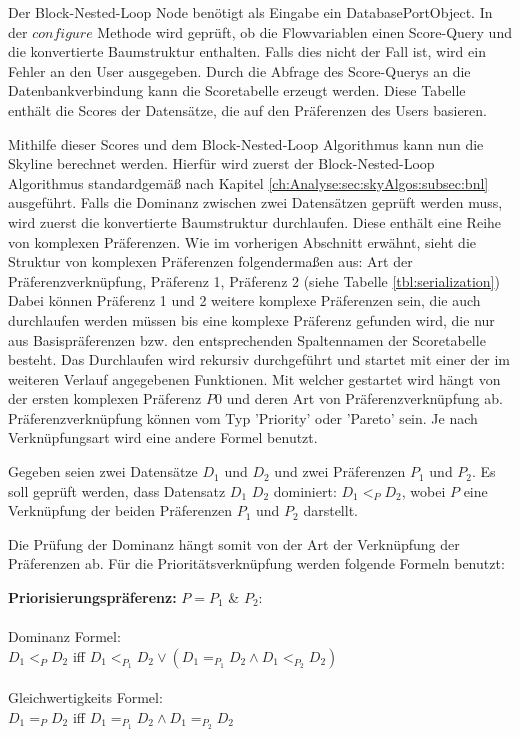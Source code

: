 Der Block-Nested-Loop Node benötigt als Eingabe ein DatabasePortObject. In der $configure$ Methode wird geprüft, ob die Flowvariablen einen Score-Query und die konvertierte Baumstruktur enthalten. Falls dies nicht der Fall ist, wird ein Fehler an den User ausgegeben.
Durch die Abfrage des Score-Querys an die Datenbankverbindung kann die Scoretabelle erzeugt werden. Diese Tabelle enthält die Scores der Datensätze, die auf den Präferenzen des Users basieren.

Mithilfe dieser Scores und dem Block-Nested-Loop Algorithmus kann nun die Skyline berechnet werden.
Hierfür wird zuerst der Block-Nested-Loop Algorithmus standardgemäß nach Kapitel \ref{ch:Analyse:sec:skyAlgos:subsec:bnl} ausgeführt. Falls die Dominanz zwischen zwei Datensätzen geprüft werden muss, wird zuerst die konvertierte Baumstruktur durchlaufen. Diese enthält eine Reihe von komplexen Präferenzen.
Wie im vorherigen Abschnitt erwähnt, sieht die Struktur von komplexen Präferenzen folgendermaßen aus: Art der Präferenzverknüpfung, Präferenz 1, Präferenz 2 (siehe Tabelle \ref{tbl:serialization})
Dabei können Präferenz 1 und 2 weitere komplexe Präferenzen sein, die auch durchlaufen werden müssen bis eine komplexe Präferenz gefunden wird, die nur aus Basispräferenzen bzw. den entsprechenden Spaltennamen der Scoretabelle besteht.
Das Durchlaufen wird rekursiv durchgeführt und startet mit einer der im weiteren Verlauf angegebenen Funktionen. Mit welcher gestartet wird hängt von der ersten komplexen Präferenz $P0$ und deren Art von Präferenzverknüpfung ab.
Präferenzverknüpfung können vom Typ 'Priority' oder 'Pareto' sein. Je nach Verknüpfungsart wird eine andere Formel benutzt.

Gegeben seien zwei Datensätze $D_1$ und $D_2$ und zwei Präferenzen $P_1$ und $P_2$.
Es soll geprüft werden, dass Datensatz $D_1$ $D_2$ dominiert: $D_1 <_P D_2$, wobei $P$ eine Verknüpfung der beiden Präferenzen $P_1$ und $P_2$ darstellt.

Die Prüfung der Dominanz hängt somit von der Art der Verknüpfung der Präferenzen ab. Für die Prioritätsverknüpfung werden folgende Formeln benutzt:

\textbf{Priorisierungspräferenz:} $P = P_1$ \& $P_2:$ \\ \\
Dominanz Formel: \\
$D_1 <_P D_2$ iff $D_1 <_{P_1} D_2 \lor (D_1 =_{P_1} D_2 \land D_1 <_{P_2} D_2)$ \\ \\
Gleichwertigkeits Formel: \\
$D_1 =_P D_2$ iff $D_1 =_{P_1} D_2 \land D_1 =_{P_2} D_2$ \\

